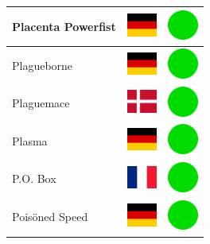 \documentclass[12pt, a4paper, twoside]{report}
\begin{document}
\begin{center}
\begin{longtable}{|p{5cm}|p{2cm}|p{2cm}|}
 Placenta Powerfist                                         & \includegraphics[width=1cm]{../4x3/de} &   \includegraphics[width=1cm]{../likes/y} \\ \hline
 Plagueborne                                                & \includegraphics[width=1cm]{../4x3/de} &   \includegraphics[width=1cm]{../likes/y} \\ \hline
 Plaguemace                                                 & \includegraphics[width=1cm]{../4x3/dk} &   \includegraphics[width=1cm]{../likes/y} \\ \hline
 Plasma                                                     & \includegraphics[width=1cm]{../4x3/de} &   \includegraphics[width=1cm]{../likes/y} \\ \hline
 P.O. Box                                                   & \includegraphics[width=1cm]{../4x3/fr} &   \includegraphics[width=1cm]{../likes/y} \\ \hline
 Poisöned Speed                                             & \includegraphics[width=1cm]{../4x3/de} &   \includegraphics[width=1cm]{../likes/y} \\ \hline

\end{longtable}
\end{center}
\end{document}
